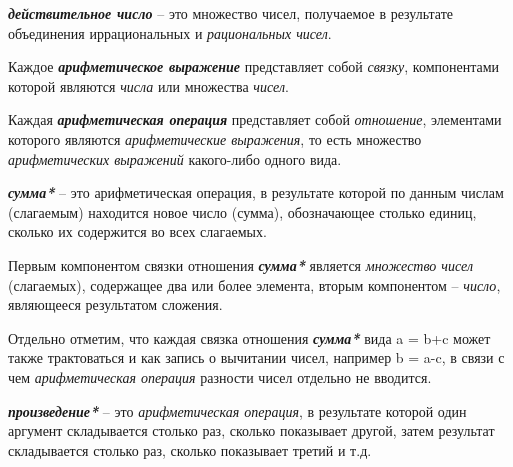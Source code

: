 \textbf{\textit{действительное число}} -- это множество чисел, получаемое в результате объединения иррациональных и \textit{рациональных чисел}.

\begin{SCn}
\end{SCn}

Каждое \textbf{\textit{арифметическое выражение}} представляет собой \textit{связку}, компонентами которой являются \textit{числа} или множества \textit{чисел}.

\begin{SCn}
\end{SCn}

Каждая \textbf{\textit{арифметическая операция}} представляет собой \textit{отношение}, элементами которого являются \textit{арифметические выражения}, то есть множество \textit{арифметических выражений} какого-либо одного вида.
	
\begin{SCn}
\end{SCn}

\textbf{\textit{сумма*}} -- это арифметическая операция, в результате которой по данным числам (слагаемым) находится новое число (сумма), обозначающее столько единиц, сколько их содержится во всех слагаемых.
		
Первым компонентом связки отношения \textbf{\textit{сумма*}} является \textit{множество чисел} (слагаемых), содержащее два или более элемента, вторым компонентом -- \textit{число}, являющееся результатом сложения.
		
Отдельно отметим, что каждая связка отношения \textbf{\textit{сумма*}} вида a = b+c может также трактоваться и как запись о вычитании чисел, например b = a-c, в связи с чем \textit{арифметическая операция} разности чисел отдельно не вводится.

\begin{SCn}
\end{SCn}

\textbf{\textit{произведение*}} -- это \textit{арифметическая операция}, в результате которой один аргумент складывается столько раз, сколько показывает другой, затем результат складывается столько раз, сколько показывает третий и т.д.
		
